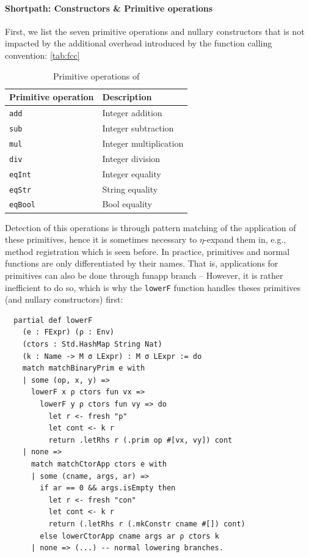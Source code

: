 \documentclass[a4paper, 11pt]{article}
\theoremstyle{remark}\newtheorem*{remark}{Remark}
\theoremstyle{definition}\newtheorem*{definition}{Definition}
\begin{document}
\paragraph{Shortpath: Constructors \& Primitive operations}
First, we list the seven primitive operations and nullary constructors that is not impacted by the additional overhead
introduced by the function calling convention: \autoref{tab:fcc}
\begin{table}[]
\centering
\begin{tabular}{ll}
  \hline
  Primitive operation & Description            \\ \hline
  \texttt{add}                 & Integer addition       \\
  \texttt{sub}                 & Integer subtraction    \\
  \texttt{mul}                 & Integer multiplication \\
  \texttt{div}                 & Integer division       \\
  \texttt{eqInt}               & Integer equality       \\
  \texttt{eqStr}               & String equality        \\
  \texttt{eqBool}              & Bool equality          \\ \hline
\end{tabular}
\caption{Primitive operations of \Lambdair}\label{tab:fcc}
\end{table}

Detection of this operations is through pattern matching of the application of these primitives, hence
it is sometimes necessary to $\eta$-expand them in, e.g., method registration which is seen before.
In practice, primitives and normal functions are only differentiated by their names. That is,
applications for primitives can also be done through funapp branch -- However, it is rather inefficient to do so, which is why the \texttt{lowerF} function handles theses primitives (and nullary constructors) first:

\begin{verbatim}
  partial def lowerF
    (e : FExpr) (ρ : Env)
    (ctors : Std.HashMap String Nat)
    (k : Name -> M σ LExpr) : M σ LExpr := do
    match matchBinaryPrim e with
    | some (op, x, y) =>
      lowerF x ρ ctors fun vx =>
        lowerF y ρ ctors fun vy => do
          let r <- fresh "p"
          let cont <- k r
          return .letRhs r (.prim op #[vx, vy]) cont
    | none =>
      match matchCtorApp ctors e with
      | some (cname, args, ar) =>
        if ar == 0 && args.isEmpty then
          let r <- fresh "con"
          let cont <- k r
          return (.letRhs r (.mkConstr cname #[]) cont)
        else lowerCtorApp cname args ar ρ ctors k
      | none => (...) -- normal lowering branches.
\end{verbatim}
\end{document}
